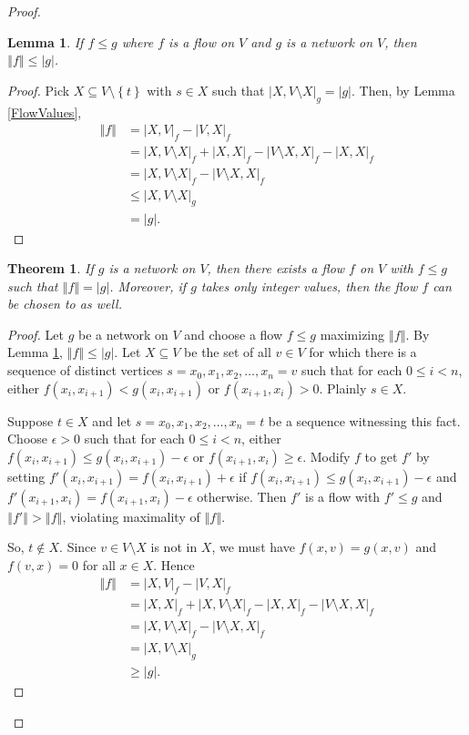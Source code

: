 \documentclass{amsbook}
\theoremstyle{plain}
\newtheorem{lemma}{Lemma}
\newtheorem{theorem}{Theorem}
\numberwithin{equation}{chapter}
\newcommand{\set}[1]{\left\{ #1 \right\}}
\newcommand{\card}[1]{\left|#1\right|}
\newcommand{\size}[1]{\left\Vert#1\right\Vert}
\begin{document}
\begin{proof}
\begin{lemma}\label{FlowAtMostCapacity}
If $f \le g$ where $f$ is a flow on $V$ and $g$ is a network on $V$, then $\size{f} \le \card{g}$.
\end{lemma}
\begin{proof}
Pick $X \subseteq V\setminus\set{t}$ with $s \in X$ such that $\card{X, V\setminus X}_g = \card{g}$.  Then, by Lemma \ref{FlowValues}, 
\begin{align*}
\size{f} &= \card{X, V}_f - \card{V, X}_f \\
&= \card{X, V\setminus X}_f + \card{X,X}_f - \card{V\setminus X, X}_f - \card{X,X}_f \\
&= \card{X, V\setminus X}_f - \card{V\setminus X, X}_f\\
&\le \card{X, V\setminus X}_g \\
&= \card{g}.
\end{align*}
\end{proof}

\begin{theorem}
If $g$ is a network on $V$, then there exists a flow $f$ on $V$ with $f \le g$ such that $\size{f} = \card{g}$.
Moreover, if $g$ takes only integer values, then the flow $f$ can be chosen to as well.
\end{theorem}
\begin{proof}
Let $g$ be a network on $V$ and choose a flow $f \le g$ maximizing $\size{f}$.  By Lemma \ref{FlowAtMostCapacity}, $\size{f} \le \card{g}$.
Let $X \subseteq V$ be the set of all $v \in V$ for which there is a sequence of distinct vertices $s = x_0, x_1, x_2, \ldots, x_n = v$ such that for each $0 \le i < n$, either
$f(x_i, x_{i+1}) < g(x_i, x_{i+1})$ or $f(x_{i+1}, x_i) > 0$.  Plainly $s \in X$.

Suppose $t \in X$ and let $s = x_0, x_1, x_2, \ldots, x_n = t$ be a sequence witnessing this fact.  
Choose $\epsilon > 0$ such that for each $0 \le i < n$, either $f(x_i, x_{i+1}) \le g(x_i, x_{i+1}) - \epsilon$ or $f(x_{i+1}, x_i) \ge \epsilon$.  Modify $f$ to get $f'$
by setting $f'(x_i, x_{i+1}) = f(x_i, x_{i+1}) + \epsilon$ if $f(x_i, x_{i+1}) \le g(x_i, x_{i+1}) - \epsilon$ and $f'(x_{i+1}, x_i) = f(x_{i+1}, x_i) -\epsilon$ otherwise.
Then $f'$ is a flow with $f' \le g$ and $\size{f'} > \size{f}$, violating maximality of $\size{f}$.

So, $t \not \in X$.  Since $v \in V \setminus X$ is not in $X$, we must have $f(x, v) = g(x,v)$ and $f(v,x) = 0$ for all $x \in X$.  Hence
\begin{align*}
\size{f} &= \card{X, V}_f - \card{V, X}_f \\
&= \card{X, X}_f + \card{X, V\setminus X}_f - \card{X, X}_f - \card{V\setminus X, X}_f\\
&= \card{X, V\setminus X}_f - \card{V\setminus X, X}_f\\
&= \card{X, V\setminus X}_g\\
&\ge \card{g}.
\end{align*}
\end{proof}


\end{proof}
\end{document}
